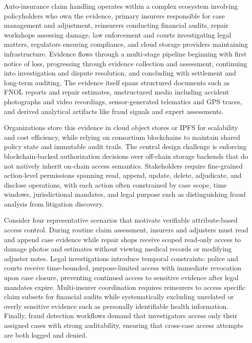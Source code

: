 \documentclass[final,5p,times,twocolumn]{elsarticle}
\begin{document}
Auto-insurance claim handling operates within a complex ecosystem involving policyholders who own the evidence, primary insurers responsible for case management and adjustment, reinsurers conducting financial audits, repair workshops assessing damage, law enforcement and courts investigating legal matters, regulators ensuring compliance, and cloud storage providers maintaining infrastructure. Evidence flows through a multi-stage pipeline beginning with first notice of loss, progressing through evidence collection and assessment, continuing into investigation and dispute resolution, and concluding with settlement and long-term auditing. The evidence itself spans structured documents such as FNOL reports and repair estimates, unstructured media including accident photographs and video recordings, sensor-generated telematics and GPS traces, and derived analytical artifacts like fraud signals and expert assessments.

Organizations store this evidence in cloud object stores or IPFS for scalability and cost efficiency, while relying on consortium blockchains to maintain shared policy state and immutable audit trails. The central design challenge is enforcing blockchain-backed authorization decisions over off-chain storage backends that do not natively inherit on-chain access semantics. Stakeholders require fine-grained action-level permissions spanning read, append, update, delete, adjudicate, and disclose operations, with each action often constrained by case scope, time windows, jurisdictional mandates, and legal purpose such as distinguishing fraud analysis from litigation discovery.

Consider four representative scenarios that motivate verifiable attribute-based access control. During routine claim assessment, insurers and adjusters must read and append case evidence while repair shops receive scoped read-only access to damage photos and estimates without viewing medical records or modifying adjuster notes. Legal investigations introduce temporal constraints: police and courts receive time-bounded, purpose-limited access with immediate revocation upon case closure, preventing continued access to sensitive evidence after legal mandates expire. Multi-insurer coordination requires reinsurers to access specific claim subsets for financial audits while systematically excluding unrelated or overly sensitive evidence such as personally identifiable health information. Finally, fraud detection workflows demand that investigators access only their assigned cases with strong auditability, ensuring that cross-case access attempts are both logged and denied.
\end{document}
